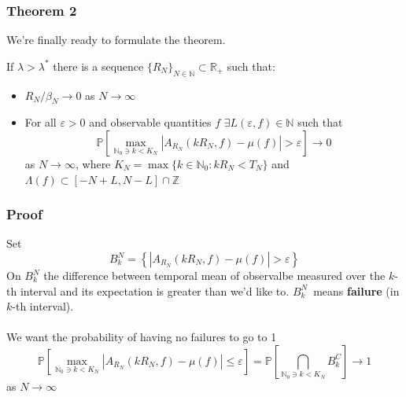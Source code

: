 \documentclass{beamer}
\begin{document}
\begin{frame}
    \frametitle{Theorem 2}

    We're finally ready to formulate the theorem.

    \begin{theorem}[Thermalization]
        If $\lambda > \lambda^*$ there is a sequence $\{R_N\}_{N \in \mathbb{N}} \subset \mathbb{R_+}$ such that:
        \begin{itemize}
            \item $R_N/\beta_N \rightarrow 0$ as $N\rightarrow \infty$
            \item For all $\varepsilon > 0$ and observable quantities $f$ $\exists L(\varepsilon, f) \in \mathbb{N}$ such that
                  \[
                      \mathbb{P}\left[ \max_{\mathbb{N}_0 \ni k < K_N}|A_{R_N}(kR_N, f) - \mu(f)| > \varepsilon\right] \rightarrow 0
                  \]
                  as $N \rightarrow \infty$, where $K_N = \max\{k \in \mathbb{N}_0: kR_N < T_N\}$ and $\Lambda(f) \subset [-N + L, N - L] \cap \mathbb{Z}$
        \end{itemize}
    \end{theorem}
\end{frame}

\begin{frame}
    \frametitle{Proof}
    Set 
    \[B^N_k = \left\{ |A_{R_N}(kR_N, f) - \mu(f)| > \varepsilon\right\}\]
    On $B^N_k$ the difference between temporal mean of observalbe measured over the $k$-th interval and its expectation is greater than we'd like to.
    $B^N_k$~means \textbf{failure} (in $k$-th interval).
    \\~\\
    We want the probability of having no failures to go to 1
    \[\mathbb{P}\left[ \max_{\mathbb{N}_0 \ni k < K_N}|A_{R_N}(kR_N, f) - \mu(f)| \leq \varepsilon   \right] =
    \mathbb{P}\left[ \bigcap_{\mathbb{N}_0 \ni k < K_N}B_k^C \right] \rightarrow 1 \]
    as $N\rightarrow\infty$
\end{frame}
\end{document}
